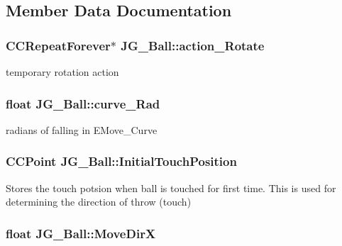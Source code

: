 \subsection{Member Data Documentation}
\hypertarget{class_j_g___ball_a602558390080ce6d8cdfcfdbc09f7b12}{
\subsubsection[{action\-\_\-\-Rotate}]{\setlength{\rightskip}{0pt plus 5cm}C\-C\-Repeat\-Forever$\ast$ J\-G\-\_\-\-Ball\-::action\-\_\-\-Rotate}}\label{class_j_g___ball_a602558390080ce6d8cdfcfdbc09f7b12}
temporary rotation action \hypertarget{class_j_g___ball_a32222cd24992fff289361884db472b23}{
\subsubsection[{curve\-\_\-\-Rad}]{\setlength{\rightskip}{0pt plus 5cm}float J\-G\-\_\-\-Ball\-::curve\-\_\-\-Rad}}\label{class_j_g___ball_a32222cd24992fff289361884db472b23}
radians of falling in E\-Move\-\_\-\-Curve \hypertarget{class_j_g___ball_aaffad54dc6e381ecaac2f3c7087e5dd7}{
\subsubsection[{Initial\-Touch\-Position}]{\setlength{\rightskip}{0pt plus 5cm}C\-C\-Point J\-G\-\_\-\-Ball\-::\-Initial\-Touch\-Position}}\label{class_j_g___ball_aaffad54dc6e381ecaac2f3c7087e5dd7}
Stores the touch potsion when ball is touched for first time. This is used for determining the direction of throw (touch) \hypertarget{class_j_g___ball_a790ad2df70ea24be8b2b01482c16c4f9}{
\subsubsection[{Move\-Dir\-X}]{\setlength{\rightskip}{0pt plus 5cm}float J\-G\-\_\-\-Ball\-::\-Move\-Dir\-X}}\label{class_j_g___ball_a790ad2df70ea24be8b2b01482c16c4f9}
